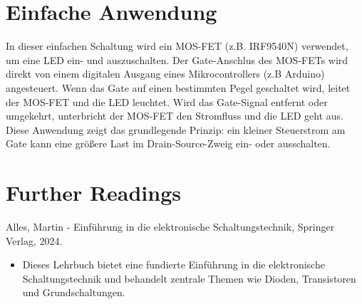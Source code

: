 \section{Einfache Anwendung}
In dieser einfachen Schaltung wird ein MOS-FET (z.B. IRF9540N) verwendet, um eine LED ein- und auszuschalten. Der Gate-Anschlus des MOS-FETs wird direkt von einem digitalen Ausgang eines Mikrocontrollers (z.B Arduino) angesteuert. Wenn das Gate auf einen bestimmten Pegel geschaltet wird, leitet der MOS-FET und die LED leuchtet. Wird das Gate-Signal entfernt oder umgekehrt, unterbricht der MOS-FET den Stromfluss und die LED geht aus. Diese Anwendung zeigt das grundlegende Prinzip: ein kleiner Steuerstrom am Gate kann eine größere Last im Drain-Source-Zweig ein- oder ausschalten. 
\begin{code}[H]
	\caption{Einfache Anwendung zum Verwenden des MOS-FETs}
	\label{code:AnwendungMOSFET}
\end{code}

\section{Further Readings}
Alles, Martin - Einführung in die elektronische Schaltungstechnik, Springer Verlag, 2024. \cite{Alles:2024}
\begin{itemize}
	\item Dieses Lehrbuch bietet eine fundierte Einführung in die elektronische Schaltungstechnik und behandelt zentrale Themen wie Dioden, Transistoren und Grundschaltungen.
\end{itemize}